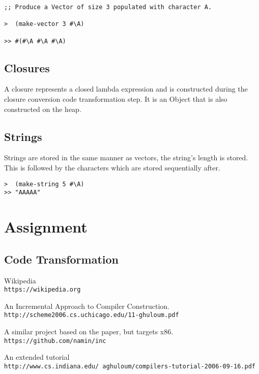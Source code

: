 \documentclass{article}
\begin{document}
\begin{verbatim}
;; Produce a Vector of size 3 populated with character A.

>  (make-vector 3 #\A) 

>> #(#\A #\A #\A)
\end{verbatim}

\subsection{Closures}

A closure represents a closed lambda expression and is constructed during the closure conversion code transformation step. It is an Object that is also constructed on the heap.

\subsection{Strings}

Strings are stored in the same manner as vectors, the string's length is stored. This is followed by the characters which are stored sequentially after. 

\begin{verbatim}
>  (make-string 5 #\A)
>> "AAAAA"

\end{verbatim}

\section{Assignment}



\subsection{Code Transformation}



\begin{thebibliography}{5}

Wikipedia
\\\texttt{https://wikipedia.org}

An Incremental Approach to Compiler Construction.
\\\texttt{http://scheme2006.cs.uchicago.edu/11-ghuloum.pdf}

A similar project based on the paper, but targets x86.
\\\texttt{https://github.com/namin/inc}

An extended tutorial 
\\\texttt{http://www.cs.indiana.edu/~aghuloum/compilers-tutorial-2006-09-16.pdf}

\end{thebibliography}  
\end{document}
